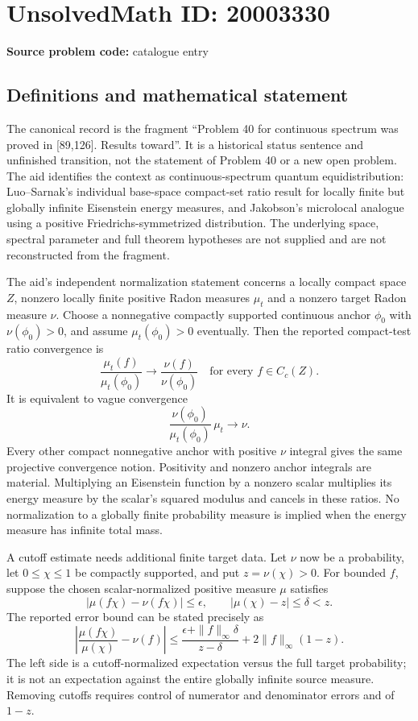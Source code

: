 \documentclass[11pt]{article}
\begin{document}
\section*{UnsolvedMath ID: 20003330}
\textbf{Source problem code:} catalogue entry
\subsection{Definitions and mathematical statement}
The canonical record is the fragment ``Problem 40 for continuous spectrum was proved in [89,126]. Results toward''. It is a historical status sentence and unfinished transition, not the statement of Problem 40 or a new open problem. The aid identifies the context as continuous-spectrum quantum equidistribution: Luo--Sarnak's individual base-space compact-set ratio result for locally finite but globally infinite Eisenstein energy measures, and Jakobson's microlocal analogue using a positive Friedrichs-symmetrized distribution. The underlying space, spectral parameter and full theorem hypotheses are not supplied and are not reconstructed from the fragment.

The aid's independent normalization statement concerns a locally compact space $Z$, nonzero locally finite positive Radon measures $\mu_t$ and a nonzero target Radon measure $\nu$. Choose a nonnegative compactly supported continuous anchor $\phi_0$ with $\nu(\phi_0)>0$, and assume $\mu_t(\phi_0)>0$ eventually. Then the reported compact-test ratio convergence is
\[
 \frac{\mu_t(f)}{\mu_t(\phi_0)}
 \longrightarrow\frac{\nu(f)}{\nu(\phi_0)}
 \quad\text{for every }f\in C_c(Z).
\]
It is equivalent to vague convergence
\[
 \frac{\nu(\phi_0)}{\mu_t(\phi_0)}\,\mu_t\longrightarrow\nu.
\]
Every other compact nonnegative anchor with positive $\nu$ integral gives the same projective convergence notion. Positivity and nonzero anchor integrals are material. Multiplying an Eisenstein function by a nonzero scalar multiplies its energy measure by the scalar's squared modulus and cancels in these ratios. No normalization to a globally finite probability measure is implied when the energy measure has infinite total mass.

A cutoff estimate needs additional finite target data. Let $\nu$ now be a probability, let $0\leq\chi\leq1$ be compactly supported, and put $z=\nu(\chi)>0$. For bounded $f$, suppose the chosen scalar-normalized positive measure $\mu$ satisfies
\[
 |\mu(f\chi)-\nu(f\chi)|\leq\epsilon,\qquad
 |\mu(\chi)-z|\leq\delta<z.
\]
The reported error bound can be stated precisely as
\[
 \left|\frac{\mu(f\chi)}{\mu(\chi)}-\nu(f)\right|
 \leq\frac{\epsilon+\|f\|_\infty\delta}{z-\delta}
       +2\|f\|_\infty(1-z).
\]
The left side is a cutoff-normalized expectation versus the full target probability; it is not an expectation against the entire globally infinite source measure. Removing cutoffs requires control of numerator and denominator errors and of $1-z$.
\end{document}
